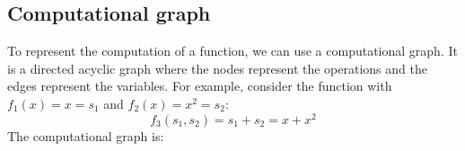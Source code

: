 \documentclass[12pt, openany]{report}
\theoremstyle{definition}
\begin{document}
\subsection{Computational graph}  
To represent the computation of a function, we can use a computational graph. It is a directed acyclic graph where the nodes represent the operations and the edges represent the variables. For example, consider the function with $f_1(x)=x=s_1$ and $f_2(x)=x^2=s_2$:
\begin{equation}
  f_3(s_1,s_2) = s_1 + s_2 = x + x^2
\end{equation}
The computational graph is:\\
\begin{center}
\end{center}
\end{document}
